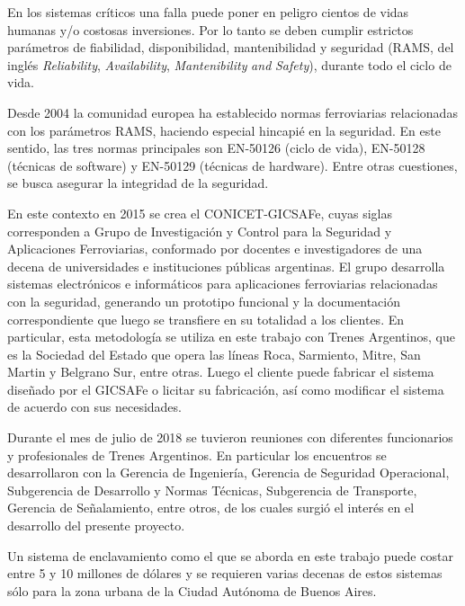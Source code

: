 		En los sistemas críticos una falla puede poner en peligro cientos de vidas humanas y/o costosas inversiones. Por lo tanto se deben cumplir estrictos parámetros de fiabilidad, disponibilidad, mantenibilidad y seguridad (RAMS, del inglés \textit{Reliability}, \textit{Availability}, \textit{Mantenibility} \textit{and} \textit{Safety}), durante todo el ciclo de vida. %

		Desde 2004 la comunidad europea ha establecido normas ferroviarias relacionadas con los parámetros RAMS, haciendo especial hincapié en la seguridad. En este sentido, las tres normas principales son EN-50126\citep{EN50126} (ciclo de vida), EN-50128\citep{EN50128} (técnicas de software) y EN-50129\citep{EN50129} (técnicas de hardware). Entre otras cuestiones, se busca asegurar la integridad de la seguridad.	
	
		En este contexto en 2015 se crea el CONICET-GICSAFe, cuyas siglas corresponden a Grupo de Investigación y Control para la Seguridad y Aplicaciones Ferroviarias, conformado por docentes e investigadores de una decena de universidades e instituciones públicas argentinas\citep{GICSAFE}. El grupo desarrolla sistemas electrónicos e informáticos para aplicaciones ferroviarias relacionadas con la seguridad, generando un prototipo funcional y la documentación correspondiente que luego se transfiere en su totalidad a los clientes. En particular, esta metodología se utiliza en este trabajo con Trenes Argentinos, que es la Sociedad del Estado que opera las líneas Roca, Sarmiento, Mitre, San Martin y Belgrano Sur, entre otras. Luego el cliente puede fabricar el sistema diseñado por el GICSAFe o licitar su fabricación, así como modificar el sistema de acuerdo con sus necesidades.   
	
		Durante el mes de julio de 2018 se tuvieron reuniones con diferentes funcionarios y profesionales de Trenes Argentinos. En particular los encuentros se desarrollaron con la Gerencia de Ingeniería, Gerencia de Seguridad Operacional, Subgerencia de Desarrollo y Normas Técnicas, Subgerencia de Transporte, Gerencia de Señalamiento, entre otros, de los cuales surgió el interés en el desarrollo del presente proyecto.
		
		 Un sistema de enclavamiento como el que se aborda en este trabajo puede costar entre 5 y 10 millones de dólares\citep{SIEMENS} y se requieren varias decenas de estos sistemas sólo para la zona urbana de la Ciudad Autónoma de Buenos Aires.
	

